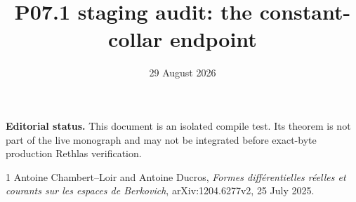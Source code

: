 \documentclass[11pt]{article}
\title{P07.1 staging audit: the constant-collar endpoint}
\author{}
\date{29 August 2026}
\begin{document}
\maketitle

\noindent
\textbf{Editorial status.}
This document is an isolated compile test.  Its theorem is not part of the
live monograph and may not be integrated before exact-byte production Rethlas
verification.




\begin{thebibliography}{1}
Antoine Chambert--Loir and Antoine Ducros,
\emph{Formes diff\'erentielles r\'eelles et courants sur les espaces de
Berkovich}, arXiv:1204.6277v2, 25 July 2025.
\end{thebibliography}
\end{document}
